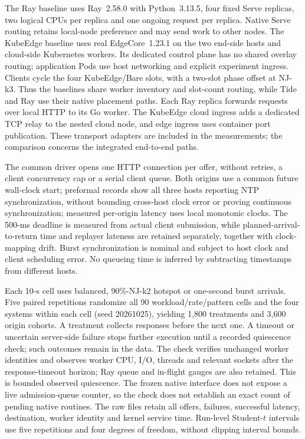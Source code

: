 The Ray baseline uses Ray~2.58.0 with Python~3.13.5, four fixed Serve replicas, two logical CPUs per replica and one ongoing request per replica. Native Serve routing retains local-node preference and may send work to other nodes. The KubeEdge baseline uses real EdgeCore~1.23.1 on the two end-side hosts and cloud-side Kubernetes workers. Its dedicated control plane has no shared overlay routing; application Pods use host networking and explicit experiment ingress. Clients cycle the four KubeEdge/Bare slots, with a two-slot phase offset at NJ-k3. Thus the baselines share worker inventory and slot-count routing, while Tide and Ray use their native placement paths. Each Ray replica forwards requests over local HTTP to its Go worker. The KubeEdge cloud ingress adds a dedicated TCP relay to the nested cloud node, and edge ingress uses container port publication. These transport adapters are included in the measurements; the comparison concerns the integrated end-to-end paths.

The common driver opens one HTTP connection per offer, without retries, a client concurrency cap or a serial client queue. Both origins use a common future wall-clock start; preformal records show all three hosts reporting NTP synchronization, without bounding cross-host clock error or proving continuous synchronization; measured per-origin latency uses local monotonic clocks. The 500-ms deadline is measured from actual client submission, while planned-arrival-to-return time and replayer lateness are retained separately, together with clock-mapping drift. Burst synchronization is nominal and subject to host clock and client scheduling error. No queueing time is inferred by subtracting timestamps from different hosts.

Each 10-s cell uses balanced, 90\%-NJ-k2 hotspot or one-second burst arrivals. Five paired repetitions randomize all 90 workload/rate/pattern cells and the four systems within each cell (seed 20261025), yielding 1,800 treatments and 3,600 origin cohorts. A treatment collects responses before the next one. A timeout or uncertain server-side failure stops further execution until a recorded quiescence check; such outcomes remain in the data. The check verifies unchanged worker identities and observes worker CPU, I/O, threads and relevant sockets after the response-timeout horizon; Ray queue and in-flight gauges are also retained. This is bounded observed quiescence. The frozen native interface does not expose a live admission-queue counter, so the check does not establish an exact count of pending native routines. The raw files retain all offers, failures, successful latency, destination, worker identity and kernel service time. Run-level Student-$t$ intervals use five repetitions and four degrees of freedom, without clipping interval bounds.

